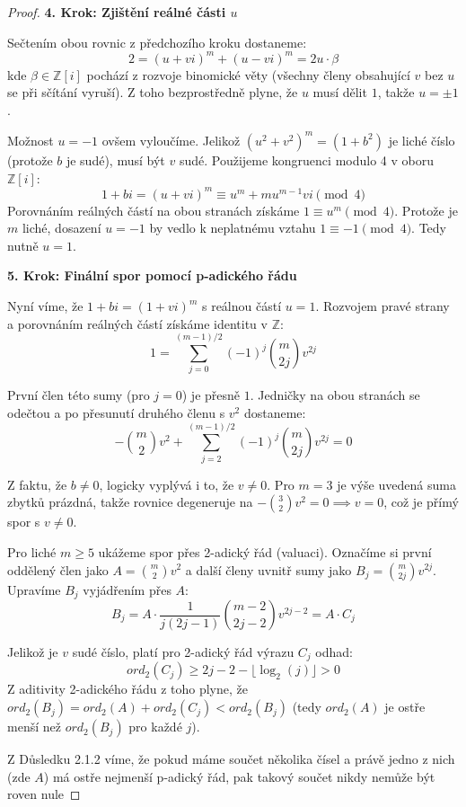 \documentclass[a4paper,12pt]{article}
\begin{document}
\begin{proof}
\vspace{1em}
\textbf{4. Krok: Zjištění reálné části $u$}
\vspace{0.5em}

Sečtením obou rovnic z předchozího kroku dostaneme:
$$2 = (u + vi)^m + (u - vi)^m = 2u \cdot \beta$$
kde $\beta \in \mathbb{Z}[i]$ pochází z rozvoje binomické věty (všechny členy obsahující $v$ bez $u$ se při sčítání vyruší). Z toho bezprostředně plyne, že $u$ musí dělit $1$, takže $u = \pm 1$.

Možnost $u = -1$ ovšem vyloučíme. Jelikož $(u^2+v^2)^m = (1+b^2)$ je liché číslo (protože $b$ je sudé), musí být $v$ sudé. Použijeme kongruenci modulo 4 v oboru $\mathbb{Z}[i]$:
$$1 + bi = (u + vi)^m \equiv u^m + m u^{m-1}vi \pmod 4 \text{}$$
Porovnáním reálných částí na obou stranách získáme $1 \equiv u^m \pmod 4$. Protože je $m$ liché, dosazení $u = -1$ by vedlo k neplatnému vztahu $1 \equiv -1 \pmod 4$. Tedy nutně $u = 1$.

\vspace{1em}
\textbf{5. Krok: Finální spor pomocí p-adického řádu}
\vspace{0.5em}

Nyní víme, že $1 + bi = (1 + vi)^m$ s reálnou částí $u = 1$. Rozvojem pravé strany a porovnáním reálných částí získáme identitu v $\mathbb{Z}$:
$$1 = \sum_{j=0}^{(m-1)/2} (-1)^j \binom{m}{2j} v^{2j} \text{}$$

První člen této sumy (pro $j=0$) je přesně $1$. Jedničky na obou stranách se odečtou a po přesunutí druhého členu s $v^2$ dostaneme:
$$-\binom{m}{2}v^2 + \sum_{j=2}^{(m-1)/2} (-1)^j \binom{m}{2j} v^{2j} = 0 \text{}$$

Z faktu, že $b \neq 0$, logicky vyplývá i to, že $v \neq 0$.
Pro $m = 3$ je výše uvedená suma zbytků prázdná, takže rovnice degeneruje na $-\binom{3}{2}v^2 = 0 \implies v = 0$, což je přímý spor s $v \neq 0$.

Pro liché $m \ge 5$ ukážeme spor přes 2-adický řád (valuaci). Označíme si první oddělený člen jako $A = \binom{m}{2}v^2$ a další členy uvnitř sumy jako $B_j = \binom{m}{2j}v^{2j}$. Upravíme $B_j$ vyjádřením přes $A$:
$$B_j = A \cdot \frac{1}{j(2j-1)}\binom{m-2}{2j-2}v^{2j-2} = A \cdot C_j \text{}$$

Jelikož je $v$ sudé číslo, platí pro 2-adický řád výrazu $C_j$ odhad:
$$ord_2(C_j) \ge 2j - 2 - \lfloor \log_2(j) \rfloor > 0 \text{}$$
Z aditivity 2-adického řádu z toho plyne, že $ord_2(B_j) = ord_2(A) + ord_2(C_j) < ord_2(B_j)$ (tedy $ord_2(A)$ je ostře menší než $ord_2(B_j)$ pro každé $j$).

Z Důsledku 2.1.2 víme, že pokud máme součet několika čísel a právě jedno z nich (zde $A$) má ostře nejmenší p-adický řád, pak takový součet nikdy nemůže být roven nule
\end{proof}
\end{document}
